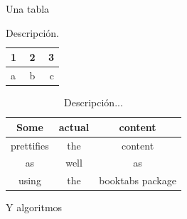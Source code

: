 Una tabla



\begin{table}[h!]
	\centering
	\caption{Descripci\'on.}
	\label{tab:table1}
	\begin{tabular}{l|c||r}
		1 & 2 & 3\\
		\hline
		a & b & c\\
	\end{tabular}
\end{table}


\begin{table}[h!]
	\centering
	\caption{Descripci\'on...}
	\label{tab:table1}
	\begin{tabular}{ccc}
		\toprule
		Some & actual & content\\
		\midrule
		prettifies & the & content\\
		as & well & as\\
		using & the & booktabs package\\
		\bottomrule
	\end{tabular}
\end{table}


Y algoritmos


